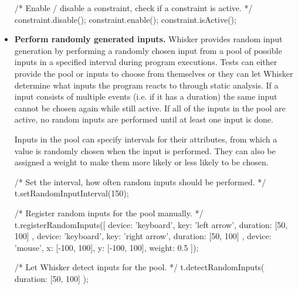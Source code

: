 \begin{itemize}
\begin{javascriptcode}
            /* Enable / disable a constraint, check if a constraint is active. */
            constraint.disable();
            constraint.enable();
            constraint.isActive();
        \end{javascriptcode}
    \item \textbf{Perform randomly generated inputs.}
        Whisker provides random input generation by performing a randomly chosen input from a pool of possible inputs
        in a specified interval during program executions.
        Tests can either provide the pool or inputs to choose from themselves
        or they can let Whisker determine what inputs the program reacts to through static analysis.
        If a input consists of multiple events (i.e. if it has a duration) the same input cannot be chosen again while still active.
        If all of the inputs in the pool are active, no random inputs are performed until at least one input is done.

        Inputs in the pool can specify intervals for their attributes,
        from which a value is randomly chosen when the input is performed.
        They can also be assigned a weight to make them more likely or less likely to be chosen.
        \begin{javascriptcode}
            /* Set the interval, how often random inputs should be performed. */
            t.setRandomInputInterval(150);

            /* Register random inputs for the pool manually. */
            t.registerRandomInputs([
                  { device: 'keyboard', key: 'left arrow', duration: [50, 100] },
                  { device: 'keyboard', key: 'right arrow', duration: [50, 100] },
                  { device: 'mouse', x: [-100, 100], y: [-100, 100], weight: 0.5 }
            ]);

            /* Let Whisker detect inputs for the pool. */
            t.detectRandomInputs({ duration: [50, 100] });
        \end{javascriptcode}
\end{itemize}
\parspace



